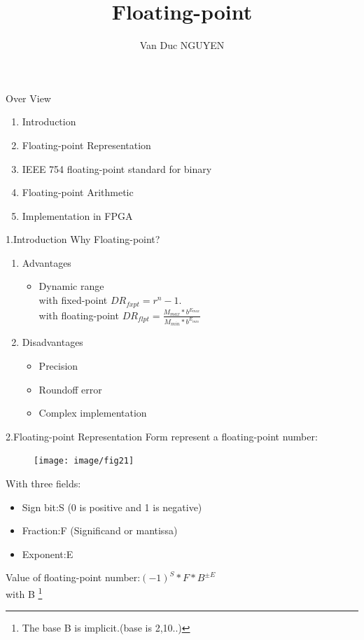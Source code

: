 \documentclass[11pt]{beamer}
\title{Floating-point}
\author{Van Duc NGUYEN}
\institute{\textbf{Viettel IC Design}}
\date{}
\begin{document}
\begin{frame}
\titlepage
\end{frame}
\begin{frame}[t]{Over View}
\begin{enumerate}
\item Introduction
\item Floating-point Representation
\item IEEE 754 floating-point standard for binary
\item Floating-point Arithmetic
\item Implementation in FPGA
\end{enumerate}
\end{frame}
\begin{frame}[t]{1.Introduction}
Why Floating-point?
\begin{enumerate}
\item Advantages
\begin{itemize}
\item Dynamic range\\
with fixed-point $DR_{fxpt}=r^n-1$.\\
with floating-point $DR_{flpt}=\frac{M_{max}*b^{E_{max}}}{M_{min}*b^{E_{min}}}$
\end{itemize}
\item Disadvantages
\begin{itemize}
\item Precision
\item Roundoff error
\item Complex implementation
\end{itemize}
\end{enumerate}
\end{frame}
\begin{frame}[t]{2.Floating-point Representation}
Form represent a floating-point number:\\
\begin{center}
    \begin{figure}[htp]
    \begin{center}
     \texttt{[image: image/fig21]}
    \end{center}
    \label{reffig21}
    \end{figure}
\end{center}
With three fields:
\begin{itemize}
\item Sign bit:S (0 is positive and 1 is negative)
\item Fraction:F (Significand or mantissa)
\item Exponent:E
\end{itemize}
Value of floating-point number:{$(-1)^S*{F}*B^{\pm{E}}$}\\
with B
\footnote{The base B is implicit.(base is 2,10..)}
\end{frame}
\end{document}
